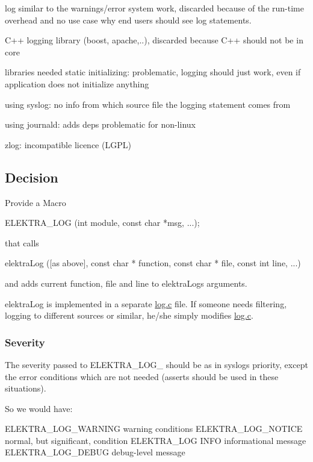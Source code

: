 \begin{DoxyItemize}
\item log similar to the warnings/error system work, discarded because of the run-\/time overhead and no use case why end users should see log statements.
\item C++ logging library (boost, apache,..), discarded because C++ should not be in core
\item libraries needed static initializing\+: problematic, logging should just work, even if application does not initialize anything
\item using syslog\+: no info from which source file the logging statement comes from
\item using journald\+: adds deps problematic for non-\/linux
\item zlog\+: incompatible licence (L\+G\+PL)
\end{DoxyItemize}

\subsection*{Decision}

Provide a Macro \begin{DoxyVerb}ELEKTRA_LOG (int module, const char *msg, ...);
\end{DoxyVerb}


that calls \begin{DoxyVerb}elektraLog ([as above], const char * function, const char * file,
        const int line, ...)
\end{DoxyVerb}


and adds current function, file and line to {\ttfamily elektra\+Log}\textquotesingle{}s arguments.

{\ttfamily elektra\+Log} is implemented in a separate {\ttfamily \hyperlink{log_8c}{log.\+c}} file. If someone needs filtering, logging to different sources or similar, he/she simply modifies {\ttfamily \hyperlink{log_8c}{log.\+c}}.

\subsubsection*{Severity}

The severity passed to {\ttfamily E\+L\+E\+K\+T\+R\+A\+\_\+\+L\+O\+G\+\_\+} should be as in syslog\textquotesingle{}s priority, except the error conditions which are not needed (asserts should be used in these situations).

So we would have\+: \begin{DoxyVerb}    ELEKTRA_LOG_WARNING    warning conditions
    ELEKTRA_LOG_NOTICE     normal, but significant, condition
    ELEKTRA_LOG            INFO    informational message
    ELEKTRA_LOG_DEBUG      debug-level message
\end{DoxyVerb}


